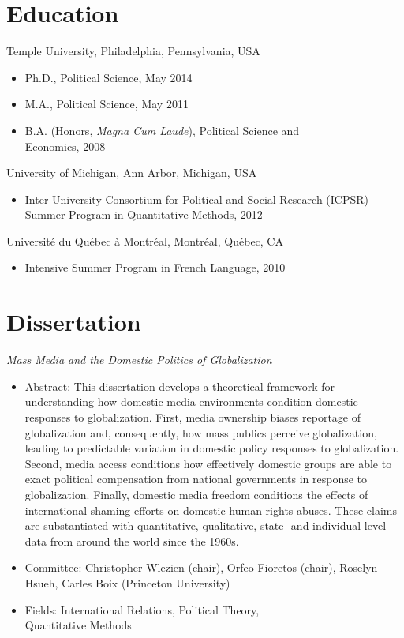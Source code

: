 \documentclass[margin, 12pt]{res} %
\begin{document}
\begin{resume}


\section{Education}
Temple University, Philadelphia, Pennsylvania, USA
\begin{itemize}
\item Ph.D., Political Science, May 2014
\item M.A., Political Science, May 2011
\item B.A. (Honors, \emph{Magna Cum Laude}), Political Science and \\
Economics, 2008
\end{itemize}

University of Michigan, Ann Arbor, Michigan, USA
\begin{itemize}
\item Inter-University Consortium for Political and Social Research (ICPSR) Summer Program in Quantitative Methods,
 2012
 \end{itemize}

Universit\'{e} du Qu\'{e}bec \`{a} Montr\'{e}al, Montr\'{e}al, Qu\'{e}bec, CA
\begin{itemize}
\item Intensive Summer Program in French Language, 2010
\end{itemize}

\section{Dissertation}
\emph{Mass Media and the Domestic Politics of Globalization} \\
\begin{itemize}
\item Abstract: This dissertation develops a theoretical framework for understanding how domestic media environments condition domestic responses to globalization. First, media ownership biases reportage of globalization and, consequently, how mass publics perceive globalization, leading to predictable variation in domestic policy responses to globalization. Second, media access conditions how effectively domestic groups are able to exact political compensation from national governments in response to globalization. Finally, domestic media freedom conditions the effects of international shaming efforts on domestic human rights abuses. These claims are substantiated with quantitative, qualitative, state- and individual-level data from around the world since the 1960s.
\item Committee: Christopher Wlezien (chair), Orfeo Fioretos (chair),
Roselyn Hsueh, Carles Boix (Princeton University)
\item Fields: International Relations, Political Theory, \\
Quantitative Methods \\
\end{itemize}


\end{resume}
\end{document}
